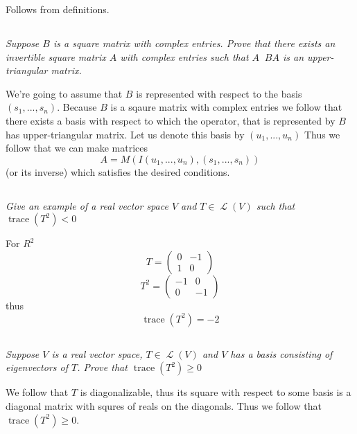 \documentclass[11pt,oneside,titlepage]{book}
\DeclareMathOperator \map {\mathcal {L}}
\DeclareMathOperator \trace {trace}
\DeclareMathOperator \inv {^{-1}}
\begin{document}
Follows from definitions.

\subsection{}

\textit{Suppose $B$ is a square matrix with complex entries. Prove that there exists an
  invertible square matrix $A$ with complex entries such that
  $A \inv B A$ is an upper-triangular matrix.}

We're going to assume that $B$ is represented with respect to the basis $(s_1, ..., s_n)$.
Because $B$ is a sqaure matrix with complex entries we follow that there exists a basis with
respect to which the operator, that is represented by $B$ has upper-triangular matrix.
Let us denote this basis by $(u_1, ..., u_n)$ 
Thus we follow that we can make matrices
$$A = M(I(u_1, ..., u_n), (s_1, ..., s_n))$$
(or its inverse) which satisfies the desired conditions.

\subsection{}

\textit{Give an example of a real vector space $V$ and $T \in \map(V)$ such that
  $\trace(T^2) < 0$}

For $R^2$
$$T =
\begin{pmatrix}
  0 & -1 \\
  1 & 0
\end{pmatrix}
$$
$$T^2 =
\begin{pmatrix}
  -1 & 0 \\
  0 & -1
\end{pmatrix}
$$
thus
$$\trace(T^2) = -2$$


\subsection{}

\textit{Suppose $V$ is a real vector space, $T \in \map(V)$ and $V$ has a basis consisting
  of eigenvectors of $T$. Prove that $\trace(T^2) \geq 0$}

We follow that $T$ is diagonalizable, thus its square with respect to some basis is
a diagonal matrix with squres of reals on the diagonals. Thus we follow that
$\trace(T^2) \geq 0$.

\subsection{}
\end{document}

